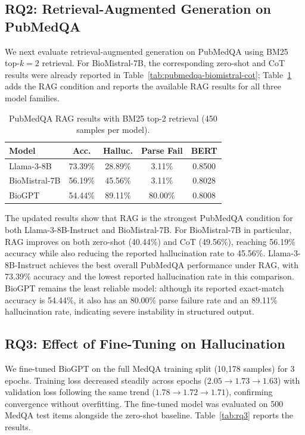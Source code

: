 \documentclass[11pt]{article}
\begin{document}
\subsection{RQ2: Retrieval-Augmented Generation on PubMedQA}

We next evaluate retrieval-augmented generation on PubMedQA using BM25 
top-$k{=}2$ retrieval. For BioMistral-7B, the corresponding zero-shot 
and CoT results were already reported in Table~\ref{tab:pubmedqa-biomistral-cot}; 
Table~\ref{tab:pubmedqa-rag} adds the RAG condition and reports the 
available RAG results for all three model families.

\begin{table}[h!]
  \centering
  \small
  \begin{tabular}{lcccc}
    \toprule
    \textbf{Model} & \textbf{Acc.} & \textbf{Halluc.} & \textbf{Parse Fail} & \textbf{BERT} \\
    \midrule
    Llama-3-8B    & 73.39\% & 28.89\% &  3.11\% & 0.8500 \\
    BioMistral-7B & 56.19\% & 45.56\% &  3.11\% & 0.8028 \\
    BioGPT        & 54.44\% & 89.11\% & 80.00\% & 0.8008 \\
    \bottomrule
  \end{tabular}
  \caption{PubMedQA RAG results with BM25 top-2 retrieval (450 samples per model).}
  \label{tab:pubmedqa-rag}
\end{table}

The updated results show that RAG is the strongest PubMedQA condition 
for both Llama-3-8B-Instruct and BioMistral-7B. For BioMistral-7B in 
particular, RAG improves on both zero-shot (40.44\%) and CoT (49.56\%), 
reaching 56.19\% accuracy while also reducing the reported 
hallucination rate to 45.56\%. Llama-3-8B-Instruct achieves the best 
overall PubMedQA performance under RAG, with 73.39\% accuracy and the 
lowest reported hallucination rate in this comparison. BioGPT remains 
the least reliable model: although its reported exact-match accuracy is 
54.44\%, it also has an 80.00\% parse failure rate and an 89.11\% 
hallucination rate, indicating severe instability in structured output.

\subsection{RQ3: Effect of Fine-Tuning on Hallucination}

We fine-tuned BioGPT on the full MedQA training split (10,178 samples) 
for 3 epochs. Training loss decreased steadily across epochs 
($2.05 \rightarrow 1.73 \rightarrow 1.63$) with validation loss 
following the same trend ($1.78 \rightarrow 1.72 \rightarrow 1.71$), 
confirming convergence without overfitting. The fine-tuned model was 
evaluated on 500 MedQA test items alongside the zero-shot baseline. Table~\ref{tab:rq3} reports the 
results.
\end{document}
